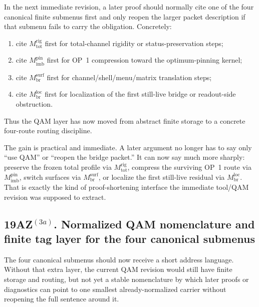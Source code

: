 \begin{corollary}
\label{cor:working-citation-rule-next-immediate-revision}
In the next immediate revision, a later proof should normally cite one of the four canonical finite submenus first and only reopen the larger packet description if that submenu fails to carry the obligation. Concretely:
\begin{enumerate}[leftmargin=2em]
 \item cite \(M^{\mathrm{rig}}_{\mathrm{tot}}\) first for total-channel rigidity or status-preservation steps;
 \item cite \(M^{\mathrm{pin}}_{\mathrm{imb}}\) first for OP~1 compression toward the optimum-pinning kernel;
 \item cite \(M^{\mathrm{surf}}_{\mathrm{br}}\) first for channel/shell/menu/matrix translation steps;
 \item cite \(M^{\mathrm{loc}}_{\mathrm{br}}\) first for localization of the first still-live bridge or readout-side obstruction.
\end{enumerate}
Thus the QAM layer has now moved from abstract finite storage to a concrete four-route routing discipline.
\end{corollary}

\begin{remark}
\label{rem:what-gained-before-proving-anything-new-submenus}
The gain is practical and immediate. A later argument no longer has to say only ``use QAM'' or ``reopen the bridge packet.'' It can now say much more sharply: preserve the frozen total profile via \(M^{\mathrm{rig}}_{\mathrm{tot}}\), compress the surviving OP~1 route via \(M^{\mathrm{pin}}_{\mathrm{imb}}\), switch surfaces via \(M^{\mathrm{surf}}_{\mathrm{br}}\), or localize the first still-live residual via \(M^{\mathrm{loc}}_{\mathrm{br}}\). That is exactly the kind of proof-shortening interface the immediate tool/QAM revision was supposed to extract.
\end{remark}

\subsection*{19AZ$^{(3a)}$. Normalized QAM nomenclature and finite tag layer for the four canonical submenus}
\label{sec:normalized-qam-tag-layer}
The four canonical submenus should now receive a short address language. Without that extra layer, the current QAM revision would still have finite storage and routing, but not yet a stable nomenclature by which later proofs or diagnostics can point to one smallest already-normalized carrier without reopening the full sentence around it.

